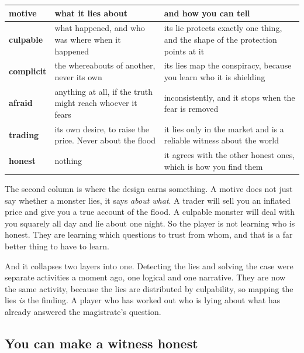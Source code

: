 \documentclass[11pt,a4paper]{article}
\begin{document}
\begin{center}
\begin{tabular}{@{}l@{\hspace{3mm}}>{\raggedright\arraybackslash}p{}@{\hspace{3mm}}>{\raggedright\arraybackslash}p{}@{}}
\toprule
\textbf{motive} & \textbf{what it lies about} & \textbf{and how you can tell} \\
\midrule
\textbf{culpable} & what happened, and who was where when it happened &
its lie protects exactly one thing, and the shape of the protection points at it \\[1mm]
\textbf{complicit} & the whereabouts of another, never its own &
its lies map the conspiracy, because you learn who it is shielding \\[1mm]
\textbf{afraid} & anything at all, if the truth might reach whoever it fears &
inconsistently, and it stops when the fear is removed \\[1mm]
\textbf{trading} & its own desire, to raise the price. Never about the flood &
it lies only in the market and is a reliable witness about the world \\[1mm]
\textbf{honest} & nothing &
it agrees with the other honest ones, which is how you find them \\
\bottomrule
\end{tabular}
\end{center}

The second column is where the design earns something. A motive does not just say whether a
monster lies, it says \emph{about what}. A trader will sell you an inflated price and give you a
true account of the flood. A culpable monster will deal with you squarely all day and lie about one
night. So the player is not learning who is honest. They are learning which questions to trust from
whom, and that is a far better thing to have to learn.

\begin{sectionbox}
And it collapses two layers into one. Detecting the lies and solving the case were separate
activities a moment ago, one logical and one narrative. They are now the same activity, because the
lies are distributed by culpability, so mapping the lies \emph{is} the finding. A player who has
worked out who is lying about what has already answered the magistrate's question.
\end{sectionbox}

\subsection{You can make a witness honest}
\end{document}
